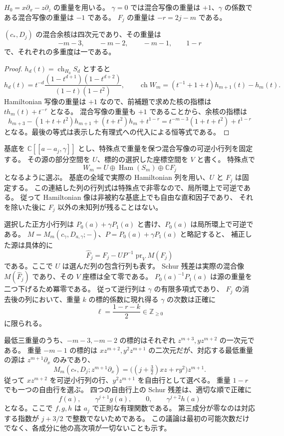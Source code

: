 $H_0=x\partial_x-z\partial_z$ の重量を用いる。
$\gamma=0$ では混合写像の重量は $+1$、$\gamma$ の係数である混合写像の重量は $-1$ である。
$F_j$ の重量は $-r=2j-m$ である。

\begin{lemma}[余核の重量]
\label{lem:resonance-cokernel-weights-v34}
$(c_*,D_j)$ の混合余核は四次元であり、その重量は
\[
 -m-3,\qquad -m-2,\qquad -m-1,\qquad 1-r
\]
で、それぞれの多重度は一である。
\end{lemma}

\begin{proof}
$h_d(t)=\operatorname{ch}_{H_0}S_d$ とすると
\[
 h_d(t)=t^{-d}\frac{(1-t^{d+1})(1-t^{d+2})}{(1-t)(1-t^2)},
 \qquad
 \operatorname{ch}W_m=(t^{-1}+1+t)h_{m+1}(t)-h_m(t).
\]
Hamiltonian 写像の重量は $+1$ なので、前補題で求めた核の指標は
$t h_m(t)+t^{-r}$ となる。
混合写像の重量も $+1$ であることから、余核の指標は
\[
 h_{m+3}-(1+t+t^2)h_{m+1}+(t+t^2)h_m+t^{1-r}
 =t^{-m-3}(1+t+t^2)+t^{1-r}
\]
となる。最後の等式は表示した有理式への代入による恒等式である。
\end{proof}

基底を $\mathbb C[[a-a_j,\gamma]]$ とし、特殊点で重量を保つ混合写像の可逆小行列を固定する。
その源の部分空間を $U$、標的の選択した座標空間を $V$ と書く。
特殊点で
\[
 W_m=U\oplus\operatorname{Ham}(S_m)\oplus\mathbb C F_j
\]
となるように選ぶ。
基底の全域で実際の Hamiltonian 列を用い、$U$ と $F_j$ は固定する。
この連結した列の行列式は特殊点で非零なので、局所環上で可逆である。
従って Hamiltonian 像は非被約な基底上でも自由な直和因子であり、
それを除いた後に $F_j$ 以外の未知列が残ることはない。

選択した正方小行列は
$P_0(a)+\gamma P_1(a)$ と書け、$P_0(a)$ は局所環上で可逆である。
$M=M_m(c_\gamma,D_{a,\gamma};-)$、$P=P_0(a)+\gamma P_1(a)$ と略記すると、
補正した源は具体的に
\[
 \widehat F_j=F_j-U P^{-1}\operatorname{pr}_V M(F_j)
\]
である。ここで $U$ は選んだ列の包含行列も表す。
Schur 残差は実際の混合像 $M(\widehat F_j)$ であり、その $V$ 座標は全て零である。
$P_0(a)^{-1}P_1(a)$ は源の重量を二つ下げるため冪零である。
従って逆行列は $\gamma$ の有限多項式であり、
$F_j$ の消去後の列において、重量 $k$ の標的係数に現れ得る $\gamma$ の次数は正確に
\[
 \ell=\frac{1-r-k}{2}\in\mathbb Z_{\geq0}
\]
に限られる。

最低三重量のうち、$-m-3,-m-2$ の標的はそれぞれ
$z^{m+3},yz^{m+2}$ の一次元である。
重量 $-m-1$ の標的は
$xz^{m+2},y^2z^{m+1}$ の二次元だが、対応する最低重量の源は
$z^{m+1}\partial_x$ のみであり、
\begin{equation}
 M_m(c_*,D_j;z^{m+1}\partial_x)
 =\bigl((j+\tfrac32)xz+r y^2\bigr)z^{m+1}.
 \label{eq:resonance-lowest-column-v34}
\end{equation}
従って $xz^{m+2}$ を可逆小行列の行、$y^2z^{m+1}$ を自由行として選べる。
重量 $1-r$ でも一つの自由行を選ぶ。
四つの自由行上の Schur 残差は、適切な順で正確に
\begin{equation}
 f(a),\qquad \gamma^{j+1}g(a),\qquad0,\qquad\gamma^{j+2}h(a)
 \label{eq:resonance-schur-weight-shape-v34}
\end{equation}
となる。ここで $f,g,h$ は $a_j$ で正則な有理関数である。
第三成分が零なのは対応する指数が $j+3/2$ で整数でないためである。
この議論は最初の可能次数だけでなく、各成分に他の高次項が一切ないことも示す。

